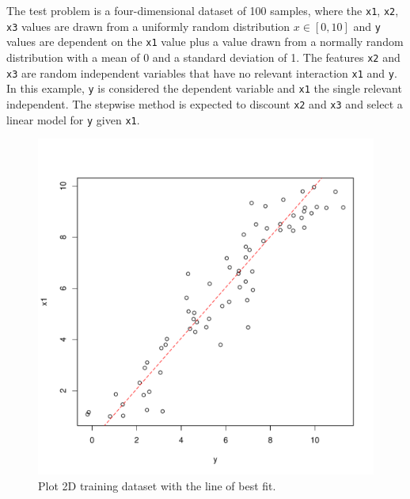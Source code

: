 The test problem is a four-dimensional dataset of 100 samples, where the \texttt{x1}, \texttt{x2}, \texttt{x3} values are drawn from a uniformly random distribution $x \in [0,10]$ and \texttt{y} values are dependent on the \texttt{x1} value plus a value drawn from a normally random distribution with a mean of 0 and a standard deviation of 1. The features \texttt{x2} and \texttt{x3} are random independent variables that have no relevant interaction \texttt{x1} and \texttt{y}. In this example, \texttt{y} is considered the dependent variable and \texttt{x1} the single relevant independent. The stepwise method is expected to discount \texttt{x2} and \texttt{x3} and select a linear model for \texttt{y} given \texttt{x1}.



\begin{figure}[htp]
\centering
\includegraphics[scale=0.45]{a_regression/stepwise_regression_result.pdf}
\caption{Plot 2D training dataset with the line of best fit.}
\label{plot:stepwise_regression_result}
\end{figure}

